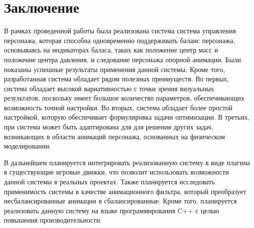 \section{Заключение}

В рамках проведенной работы была реализована система система управления персонажа, которая способна одновременно поддерживать баланс персонажа, основываясь на индикаторах баласа, таких как положение центр масс и положение центра давления, и следование персонажа опорной анимации. Были показаны успешные результаты применения данной системы. Кроме того, разработанная система обладает рядом полезных преимуществ. Во первых, система обладает высокой вариативностью с точки зрения визуальных результатов, поскольку имеет большое количество параметров, обеспечивающих возможность точной настройки. Во вторых, система обладает более простой настройкой, которую обеспечивает формулировка задачи оптимизации. В третьих, при система может быть адаптирована для для решения других задач, возникающих в области анимаций персонажа, основанных на физическом моделировании.

В дальнейшем планируется интегрировать реализованную систему в виде плагина в существующие игровые движки, что позволит использовать возможности данной системы в реальных проектах. Также планируется исследовать применимость системы в качестве анимационного фильтра, который преобразует несбалансированные анимации в сбалансированные. Кроме того, планируется реализовать данную систему на языке программирования C++ с целью повышения производительности.
